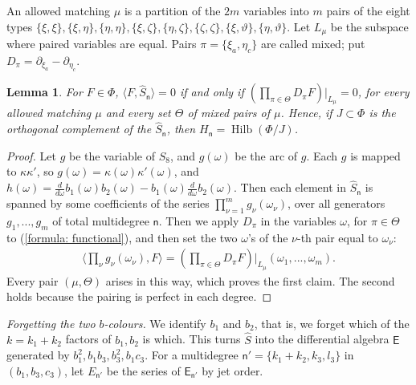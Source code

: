 \documentclass[11pt]{amsart}
\newtheorem{lemma}[theorem]{Lemma}
\theoremstyle{definition}
\theoremstyle{remark}
\begin{document}
  An allowed matching $\mu$ is a partition of the $2m$ variables into $m$ pairs of the eight types $\{\xi,\xi\},\{\xi,\eta\},\{\eta,\eta\},\{\xi,\zeta\},\{\eta,\zeta\},\{\zeta,\zeta\},\{\xi,\vartheta\},\{\eta,\vartheta\}$. Let $L_\mu$ be the subspace where paired variables are equal. Pairs $\pi=\{\xi_a,\eta_c\}$ are called mixed; put $D_\pi=\partial_{\xi_a}-\partial_{\eta_c}$. 
\begin{lemma}\label{lem:H_n}
For $F\in \Phi$, $\langle F, \widehat{S}_{\mathsf{n}}\rangle=0$ if and only if $(\prod_{\pi\in \Theta} D_\pi F)|_{L_\mu}=0$, for every allowed matching $\mu$ and every set $\Theta$ of mixed pairs of $\mu$. Hence, if $J\subset \Phi$ is the orthogonal complement of the $\widehat{S}_{\mathsf{n}}$, then $H_{\mathsf n}=\operatorname{Hilb}(\Phi/J)$. 
\end{lemma}
\begin{proof}
Let $g$ be the variable of $S_8$, and $g(\omega)$ be the arc of $g$. Each $g$ is mapped to $\kappa \kappa'$, so $g(\omega)=\kappa(\omega)\kappa'(\omega)$, and $h(\omega)=\frac{d}{d\omega}b_1(\omega)b_2(\omega)-b_1(\omega)\frac{d}{d\omega}b_2(\omega).$ Then each element in $\widehat{S}_{\mathsf{n}}$ is spanned by some coefficients of the series $\prod_{\nu=1}^{m}g_\nu(\omega_\nu)$, over all generators $g_1,...,g_m$ of total multidegree $\mathsf{n}$. Then we apply $D_\pi$ in the variables $\omega$, for $\pi\in \Theta$ to (\ref{formula: functional}), and then set the two $\omega$'s of the $\nu$-th pair equal to $\omega_\nu$:
\begin{align*}
\langle \prod_\nu g_\nu(\omega_\nu),F\rangle=(\prod_{\pi\in \Theta} D_\pi F)|_{L_\mu}(\omega_1,...,\omega_m). 	
\end{align*}
 Every pair $(\mu,\Theta)$ arises in this way, which proves the first claim. The second holds because the pairing is perfect in each degree. 
\end{proof}

\medskip\noindent\textit{Forgetting the two $b$-colours.}
We identify $b_1$ and $b_2$, that is, we forget which of the $k=k_1+k_2$ factors of $b_1, b_2$ is which. This turns $\widehat{S}$ into the differential algebra $\mathsf{E}$ generated by $b_1^2, b_1b_3, b_3^2, b_1c_3$. For a multidegree $\mathsf{n}'=\{k_1+k_2,k_3,l_3\}$ in $(b_1,b_3,c_3)$, let $E_{\mathsf{n}'}$ be the series of $
\mathsf{E}_{\mathsf{n}'}$ by jet order. 
\end{document}
